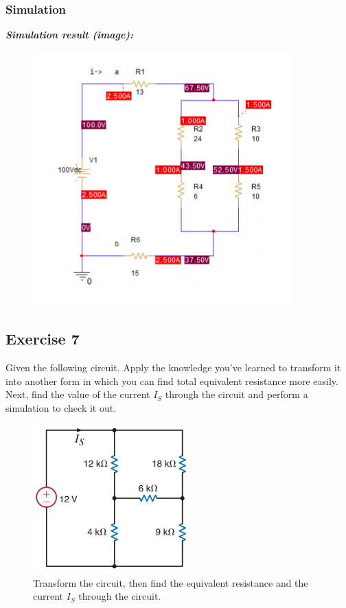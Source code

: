 \subsubsection{Simulation}
\textit{\textbf{Simulation result (image):}}
\begin{figure}[H]
    \centering
    \includegraphics[width = 10cm]{source/picture/bai_1/ex6_sim.png}
\end{figure}
\newpage

\subsection{Exercise 7}
Given the following circuit. Apply the knowledge you've learned to transform it into another form in which you can find total equivalent resistance more easily. Next, find the value of the current $I_S$ through the circuit and perform a simulation to check it out.

\begin{figure}[H]
    \centering
    \includegraphics[width = 6cm]{source/picture/bai_1/lab1_ex7_de.png}
    \caption{Transform the circuit, then find the equivalent resistance and the current $I_S$ through the circuit.}
    \label{lab1_ex7_de}
\end{figure}

